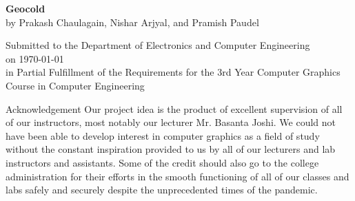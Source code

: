 \documentclass[a4paper, 12pt]{article}
\newcommand\PROJECTNAME{Geocold}
\begin{document}
\newpage
\begin{center}
	{\large \textbf{\PROJECTNAME}}\\
	by
	{Prakash Chaulagain, Nishar Arjyal, and Pramish Paudel}\\
	\vspace{0.2\baselineskip}
	\begin{spacing}{0.8}
	{Submitted to the Department of Electronics and Computer Engineering \\
	on \today \\ in Partial Fulfillment of the Requirements for the 3rd Year 
	Computer Graphics Course in Computer Engineering}\\
	\end{spacing}
\end{center}
\begin{abstract}
	Ray tracing has a rich history in the history of computing and computer 
	graphics. With this manuscript, we propose to build an offline ray tracing software using 
	the Vulkan graphics/compute library in C++. Our renderer is supposed to 
	work generically, as in take as input any file containing geometric data,
	perform a mesh render pass in order to render a mesh of the described 
	scene and then perform ray tracing with a separate pass. In this paper, we cover 
	the mathematical principles that we follow as we build our ray tracing software.
\end{abstract}

\newpage

\tableofcontents
\newpage

\begin{section}{Acknowledgement}
	Our project idea is the product of excellent supervision of all of our 
	instructors, most notably our lecturer Mr. Basanta Joshi. We could not 
	have been able to develop interest in computer graphics as a field of study 
	without the constant inspiration provided to us by all of our lecturers and 
	lab instructors and assistants. Some of the credit should also go to 
	the college administration for their efforts in the smooth functioning 
	of all of our classes and labs safely and securely despite the unprecedented 
	times of the pandemic. 
\end{section}

\newpage

\newpage
\pagestyle{fancy}
\fancyhead[C]{\PROJECTNAME}
\fancyhead[L]{}

\renewcommand{\headrulewidth}{0pt}
\renewcommand{\footrulewidth}{0pt}
\end{document}
